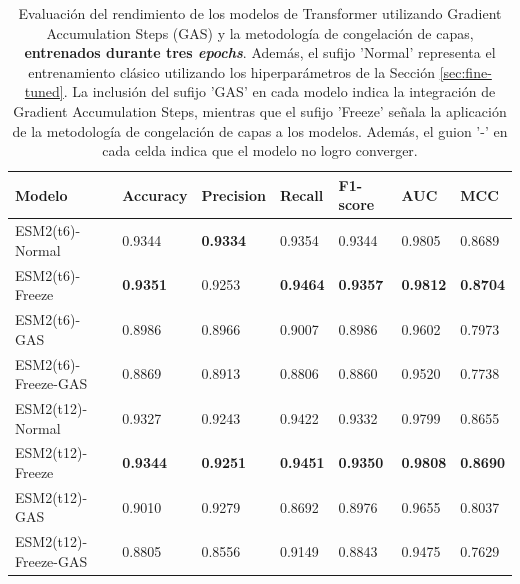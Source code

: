 \begin{table}[h]
	\centering
	\caption[Comparación de los modelos Transformer entrenados por 3 \textit{epochs}.]{Evaluación del rendimiento de los modelos de Transformer utilizando Gradient Accumulation Steps (GAS) y la metodología de congelación de capas, \textbf{entrenados durante tres \textit{epochs}}. Además, el sufijo 'Normal' representa el entrenamiento clásico utilizando los hiperparámetros de la Sección \ref{sec:fine-tuned}. La inclusión del sufijo 'GAS' en cada modelo indica la integración de Gradient Accumulation Steps, mientras que el sufijo 'Freeze' señala la aplicación de la metodología de congelación de capas a los modelos. Además, el guion '-' en cada celda indica que el modelo no logro converger.}
	\label{tab:comparison_3_epochs}
	
	\scriptsize
	\setlength{\tabcolsep}{0.5em} %
	{\renewcommand{\arraystretch}{1.5}%
	\begin{tabular}{lllllll} 
		\textbf{Modelo}       & \textbf{Accuracy} & \textbf{Precision} & \textbf{Recall} & \textbf{F1-score} & \textbf{AUC}    & \textbf{MCC}    \\ \midrule
		ESM2(t6)-Normal             & 0.9344            & \textbf{0.9334}    & 0.9354          & 0.9344            & 0.9805          & 0.8689          \\
		ESM2(t6)-Freeze      & \textbf{0.9351}   & 0.9253             & \textbf{0.9464} & \textbf{0.9357}   & \textbf{0.9812} & \textbf{0.8704} \\
		ESM2(t6)-GAS         & 0.8986            & 0.8966             & 0.9007          & 0.8986            & 0.9602          & 0.7973          \\
		ESM2(t6)-Freeze-GAS  & 0.8869            & 0.8913             & 0.8806          & 0.8860            & 0.9520          & 0.7738          \\ \midrule
		ESM2(t12)-Normal            & 0.9327            & 0.9243             & 0.9422          & 0.9332            & 0.9799          & 0.8655          \\
		ESM2(t12)-Freeze     & \textbf{0.9344}   & \textbf{0.9251}    & \textbf{0.9451} & \textbf{0.9350}   & \textbf{0.9808} & \textbf{0.8690} \\
		ESM2(t12)-GAS        & 0.9010            & 0.9279             & 0.8692          & 0.8976            & 0.9655          & 0.8037          \\
		ESM2(t12)-Freeze-GAS & 0.8805            & 0.8556             & 0.9149          & 0.8843            & 0.9475          & 0.7629          \\ \midrule

\end{tabular}}
\end{table}
